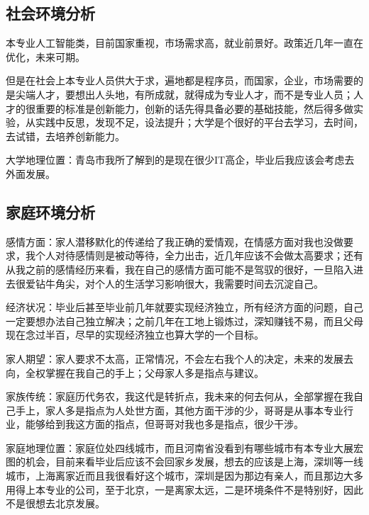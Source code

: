 \documentclass{article}
\begin{document}
\subsection{社会环境分析}
本专业人工智能类，目前国家重视，市场需求高，就业前景好。政策近几年一直在优化，未来可期。\par 
但是在社会上本专业人员供大于求，遍地都是程序员，而国家，企业，市场需要的是尖端人才，要想出人头地，有所成就，就得成为专业人才，而不是专业人员；人才的很重要的标准是创新能力，创新的话先得具备必要的基础技能，然后得多做实验，从实践中反思，发现不足，设法提升；大学是个很好的平台去学习，去时间，去试错，去培养创新能力。\par 
大学地理位置：青岛市我所了解到的是现在很少IT高企，毕业后我应该会考虑去外面发展。\par
\subsection{家庭环境分析}

感情方面：家人潜移默化的传递给了我正确的爱情观，在情感方面对我也没做要求，我个人对待感情则是被动等待，全力出击，近几年应该不会做太高要求；还有从我之前的感情经历来看，我在自己的感情方面可能不是驾驭的很好，一旦陷入进去很爱钻牛角尖，对个人的生活学习影响很大，我需要时间去沉淀自己。\par
 \par
经济状况：毕业后甚至毕业前几年就要实现经济独立，所有经济方面的问题，自己一定要想办法自己独立解决；之前几年在工地上锻炼过，深知赚钱不易，而且父母现在念过半百，尽早的实现经济独立也算大学的一个目标。\par
 \par
 
家人期望：家人要求不太高，正常情况，不会左右我个人的决定，未来的发展去向，全权掌握在我自己的手上；父母家人多是指点与建议。\par
 \par
家族传统：家庭历代务农，我这代是转折点，我未来的何去何从，全部掌握在我自己手上，家人多是指点为人处世方面，其他方面干涉的少，哥哥是从事本专业行业，能够给到我这方面的指点，但哥哥对我也多是指点，很少干涉。\par
 \par
家庭地理位置：家庭位处四线城市，而且河南省没看到有哪些城市有本专业大展宏图的机会，目前来看毕业后应该不会回家乡发展，想去的应该是上海，深圳等一线城市，上海离家近而且我很看好这个城市，深圳是因为那边有亲人，而且那边大多用得上本专业的公司，至于北京，一是离家太远，二是环境条件不是特别好，因此不是很想去北京发展。\par
 \par
\end{document}
